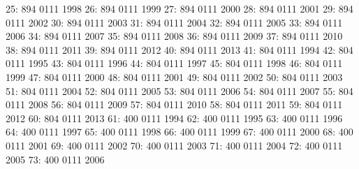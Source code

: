 \documentclass[nojss]{jss}
\begin{document}
\begin{Schunk}
\begin{Soutput}
 25:               894            0111           1998
 26:               894            0111           1999
 27:               894            0111           2000
 28:               894            0111           2001
 29:               894            0111           2002
 30:               894            0111           2003
 31:               894            0111           2004
 32:               894            0111           2005
 33:               894            0111           2006
 34:               894            0111           2007
 35:               894            0111           2008
 36:               894            0111           2009
 37:               894            0111           2010
 38:               894            0111           2011
 39:               894            0111           2012
 40:               894            0111           2013
 41:               804            0111           1994
 42:               804            0111           1995
 43:               804            0111           1996
 44:               804            0111           1997
 45:               804            0111           1998
 46:               804            0111           1999
 47:               804            0111           2000
 48:               804            0111           2001
 49:               804            0111           2002
 50:               804            0111           2003
 51:               804            0111           2004
 52:               804            0111           2005
 53:               804            0111           2006
 54:               804            0111           2007
 55:               804            0111           2008
 56:               804            0111           2009
 57:               804            0111           2010
 58:               804            0111           2011
 59:               804            0111           2012
 60:               804            0111           2013
 61:               400            0111           1994
 62:               400            0111           1995
 63:               400            0111           1996
 64:               400            0111           1997
 65:               400            0111           1998
 66:               400            0111           1999
 67:               400            0111           2000
 68:               400            0111           2001
 69:               400            0111           2002
 70:               400            0111           2003
 71:               400            0111           2004
 72:               400            0111           2005
 73:               400            0111           2006

\end{Soutput}
\end{Schunk}
\end{document}
